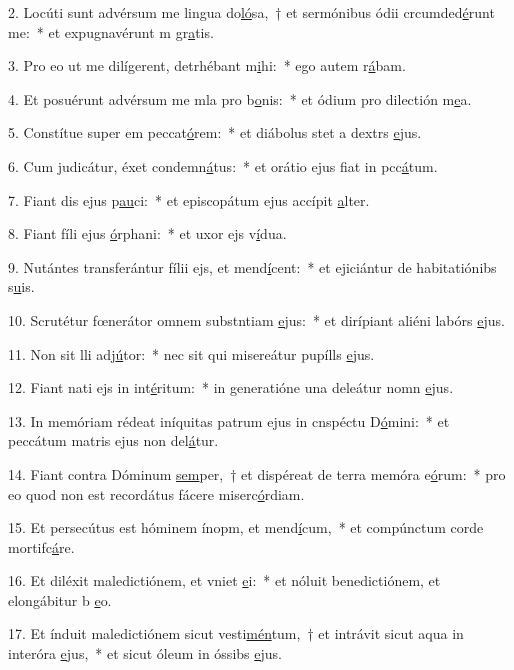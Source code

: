2. Locúti sunt advérsum me lingua do\uline{ló}sa,~† et sermónibus ódii crcumded\uline{é}runt me:~* et expugnavérunt m gr\uline{a}tis.\par 
3. Pro eo ut me dilígerent, detrhébant m\uline{i}hi:~* ego autem r\uline{á}bam.\par 
4. Et posuérunt advérsum me mla pro b\uline{o}nis:~* et ódium pro dilectión m\uline{e}a.\par 
5. Constítue super em peccat\uline{ó}rem:~* et diábolus stet a dextrs \uline{e}jus.\par 
6. Cum judicátur, éxet condemn\uline{á}tus:~* et orátio ejus fiat in pcc\uline{á}tum.\par 
7. Fiant dis ejus p\uline{au}ci:~* et episcopátum ejus accípit \uline{a}lter.\par 
8. Fiant fíli ejus \uline{ó}rphani:~* et uxor ejs v\uline{í}dua.\par 
9. Nutántes transferántur fílii ejs, et mend\uline{í}cent:~* et ejiciántur de habitatiónibs s\uline{u}is.\par 
10. Scrutétur fœnerátor omnem substntiam \uline{e}jus:~* et dirípiant aliéni labórs \uline{e}jus.\par 
11. Non sit lli adj\uline{ú}tor:~* nec sit qui misereátur pupílls \uline{e}jus.\par 
12. Fiant nati ejs in int\uline{é}ritum:~* in generatióne una deleátur nomn \uline{e}jus.\par 
13. In memóriam rédeat iníquitas patrum ejus in cnspéctu D\uline{ó}mini:~* et peccátum matris ejus non del\uline{á}tur.\par 
14. Fiant contra Dóminum \uline{sem}per,~† et dispéreat de terra memóra e\uline{ó}rum:~* pro eo quod non est recordátus fácere miserc\uline{ó}rdiam.\par 
15. Et persecútus est hóminem ínopm, et mend\uline{í}cum,~* et compúnctum corde mortifc\uline{á}re.\par 
16. Et diléxit maledictiónem, et vniet \uline{e}i:~* et nóluit benedictiónem, et elongábitur b \uline{e}o.\par 
17. Et índuit maledictiónem sicut vesti\uline{mén}tum,~† et intrávit sicut aqua in interóra \uline{e}jus,~* et sicut óleum in óssibs \uline{e}jus.\par 
